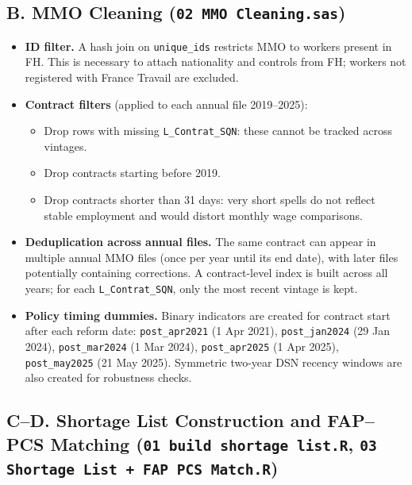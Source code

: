 \subsection*{B. MMO Cleaning \textnormal{\small(\texttt{02 MMO Cleaning.sas})}}

\begin{itemize}
  \item \textbf{ID filter.} A hash join on \texttt{unique\_ids} restricts MMO
  to workers present in FH. This is necessary to attach nationality and
  controls from FH; workers not registered with France Travail are excluded.

  \item \textbf{Contract filters} (applied to each annual file 2019--2025):
  \begin{itemize}
    \item Drop rows with missing \texttt{L\_Contrat\_SQN}: these cannot be
    tracked across vintages.
    \item Drop contracts starting before 2019.
    \item Drop contracts shorter than 31 days: very short spells do not
    reflect stable employment and would distort monthly wage comparisons.
  \end{itemize}

  \item \textbf{Deduplication across annual files.} The same contract can
  appear in multiple annual MMO files (once per year until its end date),
  with later files potentially containing corrections. A contract-level
  index is built across all years; for each \texttt{L\_Contrat\_SQN},
  only the most recent vintage is kept.

  \item \textbf{Policy timing dummies.} Binary indicators are created for
  contract start after each reform date: \texttt{post\_apr2021} (1 Apr 2021),
  \texttt{post\_jan2024} (29 Jan 2024), \texttt{post\_mar2024} (1 Mar 2024),
  \texttt{post\_apr2025} (1 Apr 2025), \texttt{post\_may2025} (21 May 2025).
  Symmetric two-year DSN recency windows are also created for robustness checks.
\end{itemize}

\subsection*{C--D. Shortage List Construction and FAP--PCS Matching
\textnormal{\small(\texttt{01 build shortage list.R},
\texttt{03 Shortage List + FAP PCS Match.R})}}

